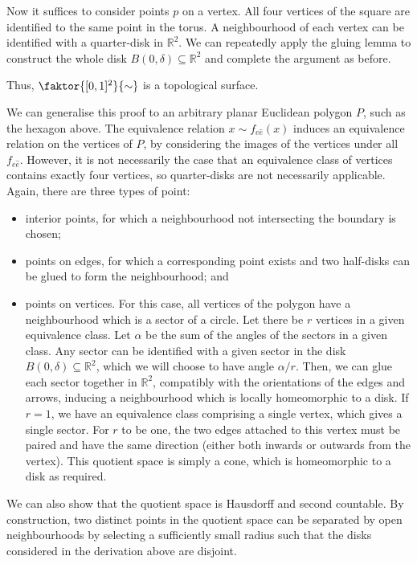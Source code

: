 \begin{example}
\begin{example}
		Now it suffices to consider points \( p \) on a vertex.
		All four vertices of the square are identified to the same point in the torus.
		A neighbourhood of each vertex can be identified with a quarter-disk in \( \mathbb R^2 \).
		We can repeatedly apply the gluing lemma to construct the whole disk \( B(0,\delta) \subseteq \mathbb R^2 \) and complete the argument as before.

		Thus, \( \faktor{[0,1]^2}{\sim} \) is a topological surface.
	\end{example}
	We can generalise this proof to an arbitrary planar Euclidean polygon \( P \), such as the hexagon above.
	The equivalence relation \( x \sim f_{e \hat e}(x) \) induces an equivalence relation on the vertices of \( P \), by considering the images of the vertices under all \( f_{e\hat e} \).
	However, it is not necessarily the case that an equivalence class of vertices contains exactly four vertices, so quarter-disks are not necessarily applicable.
	Again, there are three types of point:
	\begin{itemize}
		\item interior points, for which a neighbourhood not intersecting the boundary is chosen;
		\item points on edges, for which a corresponding point exists and two half-disks can be glued to form the neighbourhood; and
		\item points on vertices.
			For this case, all vertices of the polygon have a neighbourhood which is a sector of a circle.
			Let there be \( r \) vertices in a given equivalence class.
			Let \( \alpha \) be the sum of the angles of the sectors in a given class.
			Any sector can be identified with a given sector in the disk \( B(0,\delta) \subseteq \mathbb R^2 \), which we will choose to have angle \( \alpha / r \).
			Then, we can glue each sector together in \( \mathbb R^2 \), compatibly with the orientations of the edges and arrows, inducing a neighbourhood which is locally homeomorphic to a disk.
			If \( r = 1 \), we have an equivalence class comprising a single vertex, which gives a single sector.
			For \( r \) to be one, the two edges attached to this vertex must be paired and have the same direction (either both inwards or outwards from the vertex).
			This quotient space is simply a cone, which is homeomorphic to a disk as required.
	\end{itemize}
	We can also show that the quotient space is Hausdorff and second countable.
	By construction, two distinct points in the quotient space can be separated by open neighbourhoods by selecting a sufficiently small radius such that the disks considered in the derivation above are disjoint.

\end{example}
